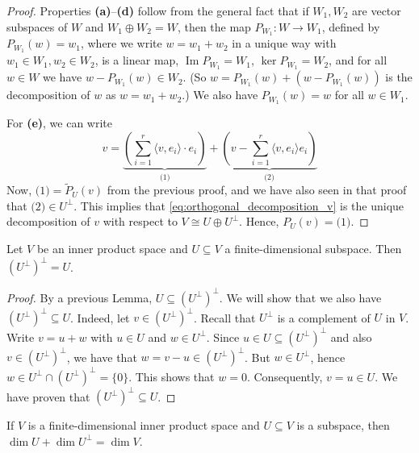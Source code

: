 \begin{proof}
Properties \textbf{(a)}--\textbf{(d)} follow from the general fact that if $W_1, W_2$ are vector subspaces of $W$ and $W_1 \oplus W_2 = W$, then the map $P_{W_1} \colon W \to W_1$, defined by $P_{W_1}(w) = w_1$, where we write $w = w_1 + w_2$ in a unique way with $w_1 \in W_1, w_2 \in W_2$, is a linear map, $\operatorname{Im} P_{W_1} = W_1$, $\ker P_{W_1} = W_2$, and for all $w \in W$ we have $w - P_{W_1}(w) \in W_2$. (So $w = P_{W_1}(w) + (w - P_{W_1}(w))$ is the decomposition of $w$ as $w = w_1 + w_2$.) We also have $P_{W_1}(w) = w$ for all $w \in W_1$.

For \textbf{(e)}, we can write
\begin{equation}
\label{eq:orthogonal_decomposition_v}
v = \underbrace{\left( \sum_{i=1}^r \langle v, e_i \rangle \cdot e_i \right)}_{\text{(1)}} + \underbrace{\left( v - \sum_{i=1}^r \langle v, e_i \rangle e_i \right)}_{\text{(2)}}
\end{equation}
Now, $\text{(1)} = \widetilde{P}_U(v)$ from the previous proof, and we have also seen in that proof that $\text{(2)} \in U^\perp$. This implies that \eqref{eq:orthogonal_decomposition_v} is the unique decomposition of $v$ with respect to $V \cong U \oplus U^\perp$. Hence, $P_U(v) = \text{(1)}$.
\end{proof}

\begin{corollary}
\label{cor:bidual_orthogonal_complement}
Let $V$ be an inner product space and $U \subseteq V$ a finite-di\-men\-sional subspace. Then $(U^\perp)^\perp = U$.
\end{corollary}

\begin{proof}
By a previous Lemma, $U \subseteq (U^\perp)^\perp$. We will show that we also have $(U^\perp)^\perp \subseteq U$. Indeed, let $v \in (U^\perp)^\perp$.
Recall that $U^\perp$ is a complement of $U$ in $V$.
Write $v = u + w$ with $u \in U$ and $w \in U^\perp$.
Since $u \in U \subseteq (U^\perp)^\perp$ and also $v \in (U^\perp)^\perp$, we have that $w = v - u \in (U^\perp)^\perp$. But $w \in U^\perp$, hence $w \in U^\perp \cap (U^\perp)^\perp = \{0\}$.
This shows that $w = 0$. Consequently, $v = u \in U$. We have proven that $(U^\perp)^\perp \subseteq U$.
\end{proof}

\begin{corollary}
\label{cor:dim_orthogonal_complement}
If $V$ is a finite-di\-men\-sional inner product space and $U \subseteq V$ is a subspace, then $\dim U + \dim U^\perp = \dim V$.
\end{corollary}

